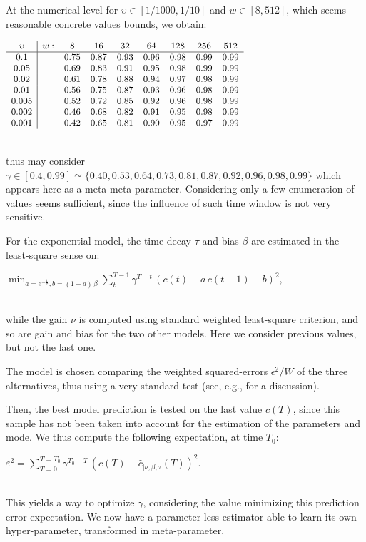 \documentclass{article}
\newcommand{\eqline}[1]{\\\centerline{$#1$}\\}
\begin{document}
At the numerical level for $\upsilon \in [1/1000, 1/10]$ and $w \in [8, 512]$, which seems reasonable concrete values bounds, we obtain:
\eqline{\small \begin{array}{c|cccccccc} \upsilon & w: &8&16&32&64&128&256&512\\ 
  \hline
   0.1&& 0.75& 0.87& 0.93 & 0.96& 0.98& 0.99& 0.99\\ 
  0.05&& 0.69& 0.83& 0.91& 0.95& 0.98& 0.99& 0.99\\ 
  0.02&& 0.61& 0.78& 0.88& 0.94& 0.97& 0.98& 0.99\\ 
  0.01&& 0.56& 0.75& 0.87& 0.93& 0.96& 0.98& 0.99\\ 
 0.005&& 0.52& 0.72& 0.85& 0.92& 0.96& 0.98& 0.99\\ 
 0.002&& 0.46& 0.68& 0.82& 0.91& 0.95& 0.98& 0.99\\ 
 0.001&& 0.42& 0.65& 0.81& 0.90& 0.95& 0.97& 0.99\\
\end {array}}
thus may consider $\gamma \in [0.4, 0.99] \simeq \{0.40,  0.53,  0.64,  0.73, 0.81,  0.87,  0.92,  0.96,  0.98,  0.99\}$ 
which appears here as a meta-meta-parameter. Considering only a few enumeration of values seems sufficient, since the influence of such time window is not very sensitive.

For the exponential model, the time decay $\tau$ and bias $\beta$ are estimated in the least-square sense on:
\eqline{\min_{a = e^{-\frac{1}{\tau}}, b = (1 - a) \, \beta} \sum_{t}^{T-1} \gamma^{T-t} \, (c(t) - a \, c(t-1) - b)^2,}
while the gain $\nu$ is computed using standard weighted least-square criterion, and so are gain and bias for the two other models. Here we consider previous values, but not the last one.

The model is chosen comparing the weighted squared-errors $\epsilon^2 / W$ of the three alternatives, thus using a very standard test (see, e.g., \cite{vieville:inria-00000172} for a discussion).

Then, the best model prediction is tested on the last value $c(T)$, since this sample has not been taken into account for the estimation of the parameters and mode. We thus compute the following expectation, at time $T_0$:
\eqline{\varepsilon^2 = \sum_{T=0}^{T=T_0} \gamma^{T_0-T} \,  (c(T) - \hat{c}_{|\nu,\beta,\tau}(T))^2.}
This yields a way to optimize $\gamma$, considering the value minimizing this prediction error expectation. We now have a parameter-less estimator able to learn its own hyper-parameter, transformed in meta-parameter.
\end{document}
